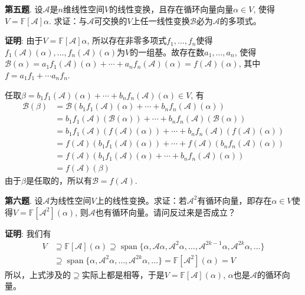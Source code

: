 {\newpageorvspace


{\bf 第五题}. 设$\mathscr{A}$是$n$维线性空间$V$的线性变换，且存在循环向量向量$\alpha \in V$, 使得$V = \mathbb{F}[\mathscr{A}]\alpha$. 求证：与$\mathscr{A}$可交换的$V$上任一线性变换$\mathscr{B}$必为$\mathscr{A}$的多项式。

\newpageorvspace

{\bf 证明}: 由于$V = \mathbb{F}[\mathscr{A}]\alpha$, 所以存在非零多项式$f_1, \ldots, f_n$使得$f_1(\mathscr{A})(\alpha), \ldots, f_n(\mathscr{A})(\alpha)$为$V$的一组基。故存在数$a_1, \ldots, a_n$, 使得$\mathscr{B}(\alpha) = a_1 f_1(\mathscr{A})(\alpha) + \cdots + a_n f_n(\mathscr{A})(\alpha) = f(\mathscr{A})(\alpha)$, 其中$f = a_1 f_1 + \cdots a_n f_n$.

任取$\beta = b_1 f_1(\mathscr{A})(\alpha) + \cdots + b_n f_n(\mathscr{A})(\alpha) \in V$, 有
\begin{align*}
\mathscr{B} (\beta) & = \mathscr{B} (b_1 f_1(\mathscr{A})(\alpha) + \cdots + b_n f_n(\mathscr{A})(\alpha)) \\
& = b_1 f_1(\mathscr{A}) (\mathscr{B}(\alpha)) + \cdots + b_n f_n(\mathscr{A})(\mathscr{B}(\alpha)) \\
& = b_1 f_1(\mathscr{A}) (f(\mathscr{A})(\alpha)) + \cdots + b_n f_n(\mathscr{A})(f(\mathscr{A})(\alpha)) \\
& = f(\mathscr{A})(b_1 f_1(\mathscr{A})(\alpha)) + \cdots + f(\mathscr{A})(b_n f_n(\mathscr{A})(\alpha)) \\
& = f(\mathscr{A}) (b_1 f_1(\mathscr{A})(\alpha) + \cdots + b_n f_n(\mathscr{A})(\alpha)) \\
& = f(\mathscr{A}) (\beta)
\end{align*}
由于$\beta$是任取的，所以有$\mathscr{B} = f(\mathscr{A})$.


\newpageorvspace


{\bf 第六题}. 设$\mathscr{A}$为线性空间$V$上的线性变换。求证：若$\mathscr{A}^2$有循环向量，即存在$\alpha\in V$使得$V = \mathbb{F}[\mathscr{A}^2](\alpha)$, 则$\mathscr{A}$也有循环向量。请问反过来是否成立？

\newpageorvspace

{\bf 证明}: 我们有
\begin{align*}
V & \supseteq \mathbb{F}[\mathscr{A}](\alpha) \supseteq \operatorname{span} \{ \alpha, \mathscr{A}\alpha, \mathscr{A}^2\alpha, \ldots, \mathscr{A}^{2k-1}\alpha, \mathscr{A}^{2k}\alpha, \ldots \} \\
& \supseteq \operatorname{span} \{ \alpha, \mathscr{A}^2\alpha, \ldots, \mathscr{A}^{2k}\alpha, \ldots \} = \mathbb{F}[\mathscr{A}^2](\alpha) = V
\end{align*}
所以，上式涉及的$\supseteq$实际上都是相等，于是$V = \mathbb{F}[\mathscr{A}](\alpha)$, $\alpha$也是$\mathscr{A}$的循环向量。

}
